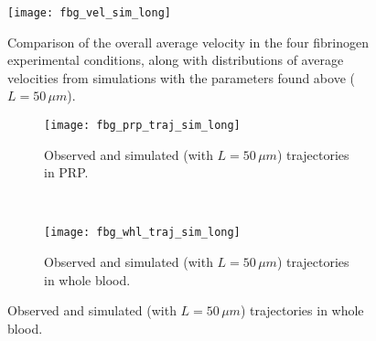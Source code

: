 \documentclass{article}
\begin{document}
\begin{figure}
  \centering
  \texttt{[image: fbg\_vel\_sim\_long]}
  \caption{Comparison of the overall average velocity in the four
    fibrinogen experimental conditions, along with distributions of
    average velocities from simulations with the parameters found
    above ($L = 50 \, \mu m$).}
  \label{fig:avg-vel-fib-long}
\end{figure}

\begin{figure}
  \centering
  \begin{subfigure}{\textwidth}
    \texttt{[image: fbg\_prp\_traj\_sim\_long]}
    \caption{Observed and simulated (with $L=50 \, \mu m$)
      trajectories in PRP.}
  \end{subfigure}
  \\
  \begin{subfigure}{\textwidth}
    \texttt{[image: fbg\_whl\_traj\_sim\_long]}
    \caption{Observed and simulated (with $L=50 \, \mu m$)
      trajectories in whole blood.}
  \end{subfigure}
  \label{fig:traj-plots-long}
\end{figure}

% 
% 
\end{document}
